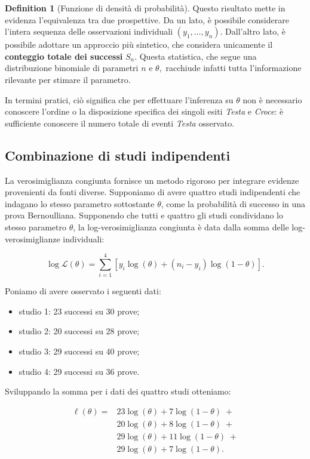 \documentclass[
  letterpaper,
  DIV=11,
  numbers=noendperiod,
  oneside]{scrreprt}
\providecommand{\tightlist}{%
  \setlength{\itemsep}{0pt}\setlength{\parskip}{0pt}}
\theoremstyle{definition}
\theoremstyle{plain}
\theoremstyle{definition}
\newtheorem{definition}{Definition}[chapter]
\theoremstyle{remark}
\begin{document}
\begin{definition}[Funzione di densità di
probabilità]
Questo risultato mette in evidenza l'equivalenza tra due prospettive. Da
un lato, è possibile considerare l'intera sequenza delle osservazioni
individuali \((y_1, \dots, y_n)\). Dall'altro lato, è possibile adottare
un approccio più sintetico, che considera unicamente il
\textbf{conteggio totale dei successi} \(S_n\). Questa statistica, che
segue una distribuzione binomiale di parametri \(n\) e \(\theta,\)
racchiude infatti tutta l'informazione rilevante per stimare il
parametro.

In termini pratici, ciò significa che per effettuare l'inferenza su
\(\theta\) non è necessario conoscere l'ordine o la disposizione
specifica dei singoli esiti \emph{Testa} e \emph{Croce}: è sufficiente
conoscere il numero totale di eventi \emph{Testa} osservato.

\subsection{Combinazione di studi
indipendenti}\label{combinazione-di-studi-indipendenti}

La verosimiglianza congiunta fornisce un metodo rigoroso per integrare
evidenze provenienti da fonti diverse. Supponiamo di avere quattro studi
indipendenti che indagano lo stesso parametro sottostante \(\theta\),
come la probabilità di successo in una prova Bernoulliana. Supponendo
che tutti e quattro gli studi condividano lo stesso parametro
\(\theta\), la log-verosimiglianza congiunta è data dalla somma delle
log-verosimiglianze individuali:

\[
\log \mathcal{L}(\theta) = \sum_{i=1}^{4} \left[ y_i \log(\theta) + (n_i - y_i) \log(1 - \theta) \right]. 
\]

Poniamo di avere osservato i seguenti dati:

\begin{itemize}
\tightlist
\item
  studio 1: 23 successi su 30 prove;
\item
  studio 2: 20 successi su 28 prove;
\item
  studio 3: 29 successi su 40 prove;
\item
  studio 4: 29 successi su 36 prove.
\end{itemize}

Sviluppando la somma per i dati dei quattro studi otteniamo:

\[
\begin{aligned}
\ell(\theta) = &23\log(\theta) + 7\log(1 - \theta) \;+ \\
&20\log(\theta) + 8\log(1 - \theta) \;+ \\
&29\log(\theta) + 11\log(1 - \theta) \;+ \\
&29\log(\theta) + 7\log(1 - \theta).
\end{aligned}
\]


\end{definition}
\end{document}
